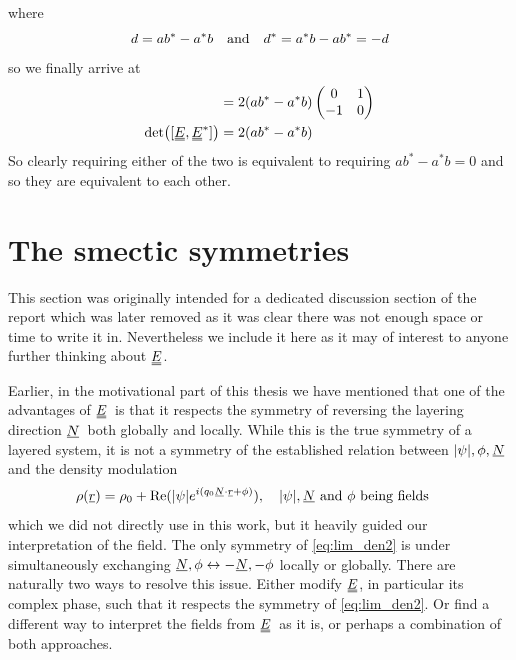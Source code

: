 \documentclass[12pt]{article}
\newcommand{\suf}[2]{\stackunder[0.5pt]{\stackunder[1pt]{\ensuremath{#1}}{\rule{\widthof{\ensuremath{#2}}*\real{0.9}}{.1ex}}}{}}
\newcommand{\duf}[2]{\stackunder[0.5pt]{\stackunder[0.8pt]{\stackunder[1pt]{\ensuremath{#1}}{\rule{\widthof{\ensuremath{#2}}*\real{0.9}}{.1ex}}}{\rule{\widthof{\ensuremath{#2}}*\real{0.9}}{.1ex}}}{}}
\newcommand{\su}[1]{\suf{#1}{#1}}
\newcommand{\du}[1]{\duf{#1}{#1}}
\newcommand{\ssu}[1]{\scriptsize\su{#1}\normalsize}
\newcommand{\NN}{\ensuremath{\su{N}}}
\newcommand{\EE}{\ensuremath{\du{E}}}
\begin{document}
\begin{appendices}
        where
        \begin{equation}
            d = ab^* - a^*b \qq{and} d^* = a^*b - ab^* = -d
        \end{equation}
        so we finally arrive at
        \begin{align}
            [\EE,\EE^*] &= 2 (ab^* - a^*b) \begin{pmatrix}
                0 & 1 \\
                -1 & 0 \\
            \end{pmatrix} \\
            \det([\EE,\EE^*]) &= 2 (ab^* - a^*b)
        \end{align}
        So clearly requiring either of the two is equivalent to requiring $ab^*-a^*b = 0$ and so they are equivalent to each other.
    \section{The smectic symmetries}
        This section was originally intended for a dedicated discussion section of the report which was later removed as it was clear there was not enough space or time to write it in.
        Nevertheless we include it here as it may of interest to anyone further thinking about \EE.

        Earlier, in the motivational part of this thesis we have mentioned that one of the advantages of \EE\ is that it respects the symmetry of reversing the layering direction \NN\ both globally and locally.
        While this is the true symmetry of a layered system, it is not a symmetry of the established relation between $|\psi|,\phi,\su{N}$ and the density modulation
        \begin{equation}\label{eq:lim_den2}
            \rho(\su{r}) = \rho_0 + \Re(|\psi| e^{i(q_0\ssu{N}\cdot\ssu{r} + \phi)}), \qq{$|\psi|,\su{N}$ and $\phi$ being fields}
        \end{equation}
        which we did not directly use in this work, but it heavily guided our interpretation of the field.
        The only symmetry of \cref{eq:lim_den2} is under simultaneously exchanging $\su{N}, \phi \leftrightarrow -\su{N}, -\phi$ locally or globally.
        There are naturally two ways to resolve this issue.
        Either modify \EE, in particular its complex phase, such that it respects the symmetry of \cref{eq:lim_den2}.
        Or find a different way to interpret the fields from \EE\ as it is, or perhaps a combination of both approaches.


\end{appendices}
\end{document}
